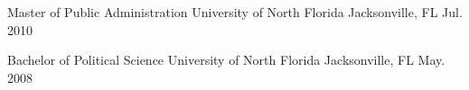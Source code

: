 

\begin{cventries}

  \cventry
    {Master of Public Administration} %
    {University of North Florida} %
    {Jacksonville, FL} %
    {Jul. 2010} %
    {}

  \cventry
    {Bachelor of Political Science} %
    {University of North Florida} %
    {Jacksonville, FL} %
    {May. 2008} %
    {}

\end{cventries}
